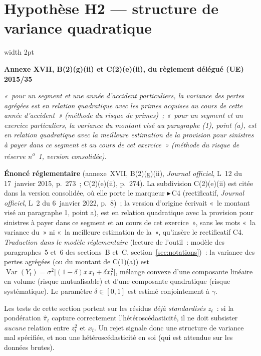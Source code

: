 \documentclass[a4paper,11pt]{article}
\newcommand{\reglement}[2]{%
  \par\vspace{2mm}\noindent\begin{minipage}{\linewidth}
  \small\setlength{\parindent}{0pt}
  \textcolor{financeblue}{\vrule width 2pt}\hspace{4mm}%
  \begin{minipage}{\dimexpr\linewidth-7mm\relax}
  \textcolor{financeblue}{\textbf{#1}}
  \par\vspace{2pt}
  {\itshape #2}
  \end{minipage}
  \end{minipage}\par\vspace{3mm}}
\begin{document}
\newpage
\clearpage
\section{Hypothèse H2 --- structure de variance quadratique}
\label{sec:h2}

\reglement{Annexe XVII, B(2)(g)(ii) et C(2)(e)(ii), du règlement délégué (UE) 2015/35}{«~pour un
segment et une année d'accident particuliers, la variance des pertes agrégées est en relation
quadratique avec les primes acquises au cours de cette année d'accident~» (méthode du risque de
primes)~; «~pour un segment et un exercice particuliers, la variance du montant visé au
paragraphe (1), point (a), est en relation quadratique avec la meilleure estimation de la
provision pour sinistres à payer dans ce segment et au cours de cet exercice~» (méthode du risque
de réserve n\textsuperscript{o}~1, version consolidée).}

\begin{encadre}
\textbf{Énoncé réglementaire} (annexe~XVII, B(2)(g)(ii), \emph{Journal officiel}, L~12 du
17~janvier 2015, p.~273~; C(2)(e)(ii), p.~274). La subdivision C(2)(e)(ii) est citée dans la version
consolidée, où elle porte le marqueur $\blacktriangleright$\,C4 (rectificatif, \emph{Journal
officiel}, L~2 du 6~janvier 2022, p.~8)~; la version d'origine écrivait «~le montant visé au
paragraphe 1, point a), est en relation quadratique avec la provision pour sinistres à payer dans
ce segment et au cours de cet exercice~», sans les mots «~la variance du~» ni «~la meilleure
estimation de la~», qu'insère le rectificatif C4. \emph{Traduction dans le modèle réglementaire}
(lecture de l'outil~: modèle des paragraphes~5 et~6 des sections~B et~C,
section~\ref{sec:notations})~: la variance des pertes agrégées (ou du montant de C(1)(a)) est
$\operatorname{Var}(Y_t) = \sigma^2\big[(1-\delta)\bar x\, x_t + \delta x_t^2\big]$, mélange
convexe d'une composante linéaire en volume (risque mutualisable) et d'une composante quadratique
(risque systématique). Le paramètre $\delta \in [0,1]$ est estimé conjointement à $\gamma$.
\end{encadre}

Les tests de cette section portent sur les résidus \emph{déjà standardisés} $z_t$~: si la
pondération $\hat\pi_t$ capture correctement l'hétéroscédasticité, il ne doit subsister
\emph{aucune} relation entre $z_t^2$ et $x_t$. Un rejet signale donc une structure de variance
mal spécifiée, et non une hétéroscédasticité en soi (qui est attendue sur les données brutes).
\end{document}
